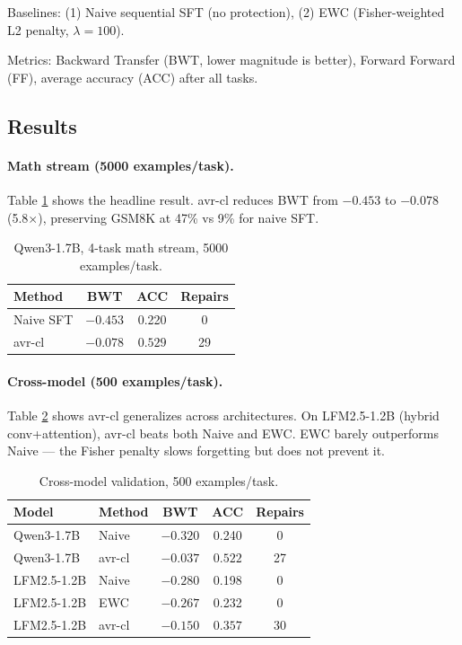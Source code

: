 \documentclass{article}
\begin{document}
Baselines: (1) Naive sequential SFT (no protection), (2) EWC (Fisher-weighted L2 penalty, $\lambda=100$).

Metrics: Backward Transfer (BWT, lower magnitude is better), Forward Forward (FF), average accuracy (ACC) after all tasks.

\subsection{Results}

\paragraph{Math stream (5000 examples/task).} Table \ref{tab:headline} shows the headline result. avr-cl reduces BWT from $-0.453$ to $-0.078$ (5.8$\times$), preserving GSM8K at 47\% vs 9\% for naive SFT.

\begin{table}[h]
\centering
\begin{tabular}{lccc}
\toprule
Method & BWT & ACC & Repairs \\
\midrule
Naive SFT & $-0.453$ & 0.220 & 0 \\
avr-cl & $\mathbf{-0.078}$ & $\mathbf{0.529}$ & 29 \\
\bottomrule
\end{tabular}
\caption{Qwen3-1.7B, 4-task math stream, 5000 examples/task.}
\label{tab:headline}
\end{table}

\paragraph{Cross-model (500 examples/task).} Table \ref{tab:crossmodel} shows avr-cl generalizes across architectures. On LFM2.5-1.2B (hybrid conv+attention), avr-cl beats both Naive and EWC. EWC barely outperforms Naive — the Fisher penalty slows forgetting but does not prevent it.

\begin{table}[h]
\centering
\begin{tabular}{llccc}
\toprule
Model & Method & BWT & ACC & Repairs \\
\midrule
Qwen3-1.7B & Naive & $-0.320$ & 0.240 & 0 \\
Qwen3-1.7B & avr-cl & $\mathbf{-0.037}$ & $\mathbf{0.522}$ & 27 \\
\midrule
LFM2.5-1.2B & Naive & $-0.280$ & 0.198 & 0 \\
LFM2.5-1.2B & EWC & $-0.267$ & 0.232 & 0 \\
LFM2.5-1.2B & avr-cl & $\mathbf{-0.150}$ & $\mathbf{0.357}$ & 30 \\
\bottomrule
\end{tabular}
\caption{Cross-model validation, 500 examples/task.}
\label{tab:crossmodel}
\end{table}
\end{document}
